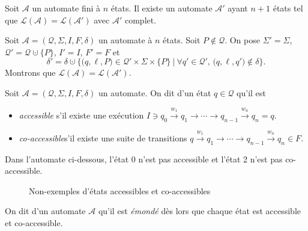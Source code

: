 \begin{prop}
	Soit $\mathcal{A}$\/ un automate fini à $n$\/ états. Il existe un automate $\mathcal{A}'$\/ ayant $n+1$\/ états tel que $\mathcal{L}(\mathcal{A}) = \mathcal{L}(\mathcal{A}')$\/ avec $\mathcal{A}'$\/ complet.
\end{prop}

\begin{prv}
	Soit $\mathcal{A} = (\mathcal{Q}, \Sigma, I, F, \delta)$ un automate à $n$\/ états. Soit $P \not\in \mathcal{Q}$. On pose $\Sigma' = \Sigma$, $\mathcal{Q}' = \mathcal{Q} \cupdot \{P\}$, $I' = I$, $F' = F$\/ et \[
		\delta' = \delta \cupdot \Big\{\big(q,\ell,P\big) \in \mathcal{Q}' \times \Sigma \times \{P\} \:\Big|\: \forall  q' \in \mathcal{Q}',\,\big(q, \ell,q'\big) \not\in \delta\Big\}
	.\]
	Montrons que $\mathcal{L}(\mathcal{A}) = \mathcal{L}(\mathcal{A}')$.

\end{prv}

\begin{defn}
	Soit $\mathcal{A} = (\mathcal{Q}, \Sigma, I, F, \delta)$\/ un automate. On dit d'un état $q \in \mathcal{Q}$ qu'il est
	\begin{itemize}
		\item {\it accessible}\/ s'il existe une exécution $I \ni q_0 \xrightarrow{w_1} q_1 \to \cdots \to q_{n-1} \xrightarrow{w_n} q_n = q$.
		\item {\it co-accessible}\/s'il existe une suite de transitions $q \xrightarrow{w_1} q_1 \to \cdots \to q_{n-1} \xrightarrow{w_n} q_n \in F$.

	\end{itemize}
\end{defn}

Dans l'automate ci-dessous, l'état 0 n'est pas accessible et l'état 2 n'est pas co-accessible.

\begin{figure}[H]
	\centering
	\caption{Non-exemples d'états accessibles et co-accessibles}
\end{figure}

\begin{defn}
	On dit d'un automate $\mathcal{A}$\/ qu'il est {\it émondé}\/ dès lors que chaque état est accessible et co-accessible.
\end{defn}

